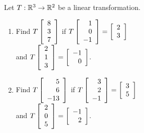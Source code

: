 \begin{multicols}{2}
\begin{ex}
Let $T : \mathbb{R}^3 \to \mathbb{R}^2$ be a linear transformation.

{\footnotesize
\begin{enumerate}[label={\alph*.}]
\item Find $T \left[ \begin{array}{r}
8 \\
3 \\
7
\end{array} \right]$
 if $T \left[ \begin{array}{r}
 1 \\
 0 \\
 -1
 \end{array} \right] = \left[ \begin{array}{r}
 	2 \\
 	3 
 \end{array} \right]$
 \\ and   $T \left[ \begin{array}{r}
 2 \\
 1 \\
 3
 \end{array} \right] = \left[ \begin{array}{r}
 -1 \\
 0
 \end{array} \right]$.

\item Find $T \left[ \begin{array}{r}
5 \\
6 \\
-13
\end{array} \right]$
 if $T \left[ \begin{array}{r}
 3 \\
 2\\
 -1
 \end{array} \right] = \left[ \begin{array}{r}
 3 \\
 5 
 \end{array} \right]$
\\ and $T \left[ \begin{array}{r}
 2 \\
 0 \\
 5
 \end{array} \right] = \left[ \begin{array}{r}
 -1 \\
 2
 \end{array} \right]$.


\end{enumerate}}
\end{ex}
\end{multicols}
